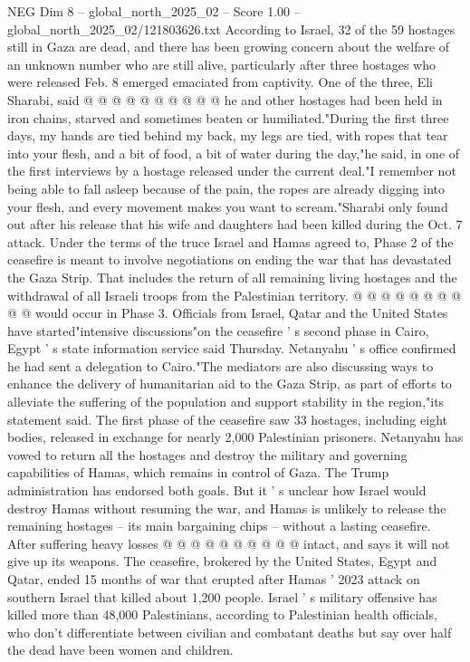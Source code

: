 \begin{textsample}{NEG Dim 8 – global\_north\_2025\_02 – Score 1.00 – global\_north\_2025\_02/121803626.txt}
According to Israel, 32 of the 59 hostages still in Gaza are dead, and there has been growing concern about the welfare of an unknown number who are still alive, particularly after three hostages who were released Feb. 8 emerged emaciated from captivity.
One of the three, Eli Sharabi, said @ @ @ @ @ @ @ @ @ @ he and other hostages had been held in iron chains, starved and sometimes beaten or humiliated."During the first three days, my hands are tied behind my back, my legs are tied, with ropes that tear into your flesh, and a bit of food, a bit of water during the day,"he said, in one of the first interviews by a hostage released under the current deal."I remember not being able to fall asleep because of the pain, the ropes are already digging into your flesh, and every movement makes you want to scream."Sharabi only found out after his release that his wife and daughters had been killed during the Oct. 7 attack.
Under the terms of the truce Israel and Hamas agreed to, Phase 2 of the ceasefire is meant to involve negotiations on ending the war that has devastated the Gaza Strip.
That includes the return of all remaining living hostages and the withdrawal of all Israeli troops from the Palestinian territory. @ @ @ @ @ @ @ @ @ @ would occur in Phase 3.
Officials from Israel, Qatar and the United States have started"intensive discussions"on the ceasefire ' s second phase in Cairo, Egypt ' s state information service said Thursday.
Netanyahu ' s office confirmed he had sent a delegation to Cairo."The mediators are also discussing ways to enhance the delivery of humanitarian aid to the Gaza Strip, as part of efforts to alleviate the suffering of the population and support stability in the region,"its statement said.
The first phase of the ceasefire saw 33 hostages, including eight bodies, released in exchange for nearly 2,000 Palestinian prisoners.
Netanyahu has vowed to return all the hostages and destroy the military and governing capabilities of Hamas, which remains in control of Gaza.
The Trump administration has endorsed both goals.
But it ' s unclear how Israel would destroy Hamas without resuming the war, and Hamas is unlikely to release the remaining hostages -- its main bargaining chips -- without a lasting ceasefire.
After suffering heavy losses @ @ @ @ @ @ @ @ @ @ intact, and says it will not give up its weapons.
The ceasefire, brokered by the United States, Egypt and Qatar, ended 15 months of war that erupted after Hamas ' 2023 attack on southern Israel that killed about 1,200 people.
Israel ' s military offensive has killed more than 48,000 Palestinians, according to Palestinian health officials, who don't differentiate between civilian and combatant deaths but say over half the dead have been women and children.

\end{textsample}
